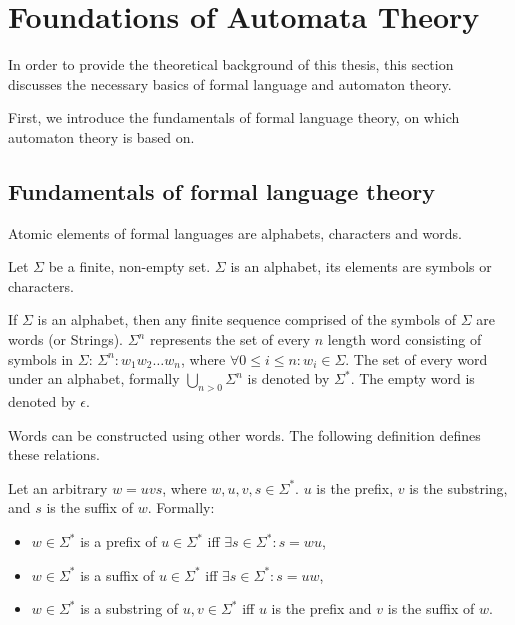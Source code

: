 \section{Foundations of Automata Theory} \label{sec_backgrmodeling}






In order to provide the theoretical background of this thesis, this section discusses the necessary basics of formal language and automaton theory.


First, we introduce the fundamentals of formal language theory, on which automaton theory is based on. 

\subsection{Fundamentals of formal language theory}
Atomic elements of formal languages are alphabets, characters and words.

\begin{definition}[Alphabet]
	Let $\Sigma$ be a finite, non-empty set. $\Sigma$ is an alphabet, its elements are symbols or characters.
\end{definition}

\begin{definition}[Word]
	If $\Sigma$ is an alphabet, then any finite sequence comprised of the symbols of $\Sigma$ are words (or Strings). $\Sigma^{n}$ represents the set of every $n$ length word consisting of symbols in $\Sigma$: $\Sigma^{n}: w_1w_2\ldots w_n$, where $\forall 0 \leq i \leq n: w_i \in \Sigma$. The set of every word under an alphabet, formally $\bigcup\limits_{n>0}^{} \Sigma^{n}$ is denoted by $\Sigma^{*}$. The empty word is denoted by $\epsilon$.
\end{definition}

Words can be constructed using other words. The following definition defines these relations.

\begin{definition}
	Let an arbitrary $w = uvs$, where $w, u, v, s\in\Sigma^*$. $u$ is the prefix, $v$ is the substring, and $s$ is the suffix of $w$. Formally:
	\begin{itemize}
		\item $w\in\Sigma^*$ is a prefix of $u\in\Sigma^*$ iff $\exists s\in\Sigma^*: s=wu$,
		\item $w\in\Sigma^*$ is a suffix of $u\in\Sigma^*$ iff $\exists s\in\Sigma^*: s=uw$,
		\item $w\in\Sigma^*$ is a substring of $u, v\in\Sigma^*$ iff $u$ is the prefix and $v$ is the suffix of $w$.
	\end{itemize}
\end{definition}

